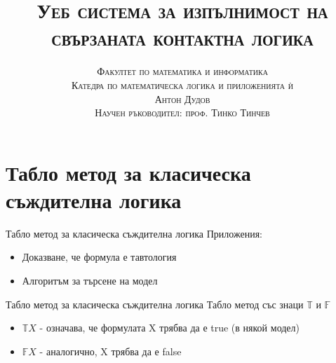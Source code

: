 \documentclass[14pt, aspectratio=169]{beamer}
\date[\today]{}
\title{\textsc{Уеб система за изпълнимост на свързаната контактна логика}}
\author[Антон Дудов]{
	\textsc{Факултет по математика и информатика} \\
	\textsc{Катедра по математическа логика и приложенията ѝ} \\ [8mm]
	\textsc{Антон Дудов} \\ [8mm]
	\small\textsc{Научен ръководител: проф. Тинко Тинчев}
}
\newcommand\ST{\mathbb{T}}
\newcommand\SF{\mathbb{F}}
\begin{document}
\begin{frame}
\titlepage
\end{frame}

\begin{frame}
\tableofcontents
\end{frame}

\section{Табло метод за класическа съждителна логика}

\begin{frame}{Табло метод за класическа съждителна логика}
Приложения:
\begin{itemize}
	\item<1-> Доказване, че формула е тавтология

	\item<3-> Алгоритъм за търсене на модел %
\end{itemize}
\end{frame}


\begin{frame}{Табло метод за класическа съждителна логика}
	Табло метод със знаци $\ST$ и $\SF$
	\begin{itemize}
		\item $\ST X$ - означава, че формулата X трябва да е true (в някой модел)
		\item $\SF X$ - аналогично, X трябва да е false
	\end{itemize}
\end{frame}
\end{document}
